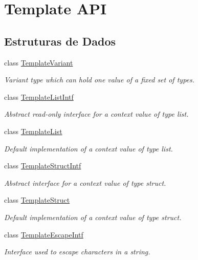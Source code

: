 \hypertarget{group__template__api}{\section{Template A\-P\-I}
\label{group__template__api}
}
\subsection*{Estruturas de Dados}
\begin{DoxyCompactItemize}
\item 
class \hyperlink{class_template_variant}{Template\-Variant}
\begin{DoxyCompactList}\small\item\em Variant type which can hold one value of a fixed set of types. \end{DoxyCompactList}\item 
class \hyperlink{class_template_list_intf}{Template\-List\-Intf}
\begin{DoxyCompactList}\small\item\em Abstract read-\/only interface for a context value of type list. \end{DoxyCompactList}\item 
class \hyperlink{class_template_list}{Template\-List}
\begin{DoxyCompactList}\small\item\em Default implementation of a context value of type list. \end{DoxyCompactList}\item 
class \hyperlink{class_template_struct_intf}{Template\-Struct\-Intf}
\begin{DoxyCompactList}\small\item\em Abstract interface for a context value of type struct. \end{DoxyCompactList}\item 
class \hyperlink{class_template_struct}{Template\-Struct}
\begin{DoxyCompactList}\small\item\em Default implementation of a context value of type struct. \end{DoxyCompactList}\item 
class \hyperlink{class_template_escape_intf}{Template\-Escape\-Intf}
\begin{DoxyCompactList}\small\item\em Interface used to escape characters in a string. \end{DoxyCompactList}\item 

\end{DoxyCompactItemize}
